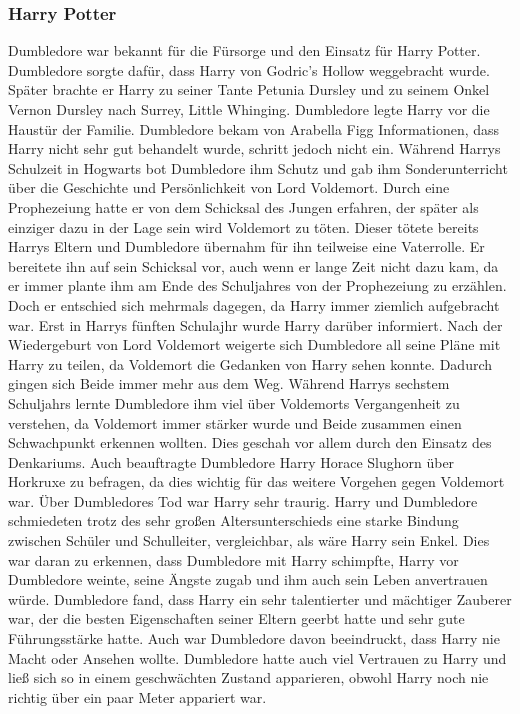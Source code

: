 \documentclass[a4paper, 10pt]{article}
\begin{document}
\subsubsection*{\large Harry Potter}
Dumbledore war bekannt für die Fürsorge und den Einsatz für Harry Potter. Dumbledore sorgte dafür, dass Harry von Godric's Hollow weggebracht wurde. Später brachte er Harry zu seiner Tante Petunia Dursley und zu seinem Onkel Vernon Dursley nach Surrey, Little Whinging. Dumbledore legte Harry vor die Haustür der Familie. Dumbledore bekam von Arabella Figg Informationen, dass Harry nicht sehr gut behandelt wurde, schritt jedoch nicht ein. Während Harrys Schulzeit in Hogwarts bot Dumbledore ihm Schutz und gab ihm Sonderunterricht über die Geschichte und Persönlichkeit von Lord Voldemort.
\vspace{10pt}
\newline
Durch eine Prophezeiung hatte er von dem Schicksal des Jungen erfahren, der später als einziger dazu in der Lage sein wird Voldemort zu töten. Dieser tötete bereits Harrys Eltern und Dumbledore übernahm für ihn teilweise eine Vaterrolle. Er bereitete ihn auf sein Schicksal vor, auch wenn er lange Zeit nicht dazu kam, da er immer plante ihm am Ende des Schuljahres von der Prophezeiung zu erzählen. Doch er entschied sich mehrmals dagegen, da Harry immer ziemlich aufgebracht war. Erst in Harrys fünften Schulajhr wurde Harry darüber informiert.
\vspace{10pt}
\newline
Nach der Wiedergeburt von Lord Voldemort weigerte sich Dumbledore all seine Pläne mit Harry zu teilen, da Voldemort die Gedanken von Harry sehen konnte. Dadurch gingen sich Beide immer mehr aus dem Weg.
\vspace{10pt}
\newline
Während Harrys sechstem Schuljahrs lernte Dumbledore ihm viel über Voldemorts Vergangenheit zu verstehen, da Voldemort immer stärker wurde und Beide zusammen einen Schwachpunkt erkennen wollten. Dies geschah vor allem durch den Einsatz des Denkariums. Auch beauftragte Dumbledore Harry Horace Slughorn über Horkruxe zu befragen, da dies wichtig für das weitere Vorgehen gegen Voldemort war. Über Dumbledores Tod war Harry sehr traurig.
\vspace{10pt}
\newline
Harry und Dumbledore schmiedeten trotz des sehr großen Altersunterschieds eine starke Bindung zwischen Schüler und Schulleiter, vergleichbar, als wäre Harry sein Enkel. Dies war daran zu erkennen, dass Dumbledore mit Harry schimpfte, Harry vor Dumbledore weinte, seine Ängste zugab und ihm auch sein Leben anvertrauen würde. Dumbledore fand, dass Harry ein sehr talentierter und mächtiger Zauberer war, der die besten Eigenschaften seiner Eltern geerbt hatte und sehr gute Führungsstärke hatte. Auch war Dumbledore davon beeindruckt, dass Harry nie Macht oder Ansehen wollte. Dumbledore hatte auch viel Vertrauen zu Harry und ließ sich so in einem geschwächten Zustand apparieren, obwohl Harry noch nie richtig über ein paar Meter appariert war.
\end{document}
